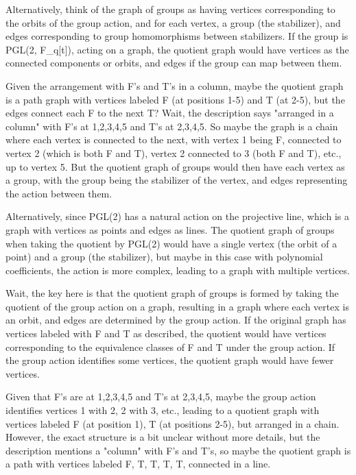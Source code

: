 Alternatively, think of the graph of groups as having vertices corresponding to the orbits of the group action, and for each vertex, a group (the stabilizer), and edges corresponding to group homomorphisms between stabilizers. If the group is PGL(2, F_q[t]), acting on a graph, the quotient graph would have vertices as the connected components or orbits, and edges if the group can map between them. 

Given the arrangement with F's and T's in a column, maybe the quotient graph is a path graph with vertices labeled F (at positions 1-5) and T (at 2-5), but the edges connect each F to the next T? Wait, the description says "arranged in a column" with F's at 1,2,3,4,5 and T's at 2,3,4,5. So maybe the graph is a chain where each vertex is connected to the next, with vertex 1 being F, connected to vertex 2 (which is both F and T), vertex 2 connected to 3 (both F and T), etc., up to vertex 5. But the quotient graph of groups would then have each vertex as a group, with the group being the stabilizer of the vertex, and edges representing the action between them. 

Alternatively, since PGL(2) has a natural action on the projective line, which is a graph with vertices as points and edges as lines. The quotient graph of groups when taking the quotient by PGL(2) would have a single vertex (the orbit of a point) and a group (the stabilizer), but maybe in this case with polynomial coefficients, the action is more complex, leading to a graph with multiple vertices. 

Wait, the key here is that the quotient graph of groups is formed by taking the quotient of the group action on a graph, resulting in a graph where each vertex is an orbit, and edges are determined by the group action. If the original graph has vertices labeled with F and T as described, the quotient would have vertices corresponding to the equivalence classes of F and T under the group action. If the group action identifies some vertices, the quotient graph would have fewer vertices. 

Given that F's are at 1,2,3,4,5 and T's at 2,3,4,5, maybe the group action identifies vertices 1 with 2, 2 with 3, etc., leading to a quotient graph with vertices labeled F (at position 1), T (at positions 2-5), but arranged in a chain. However, the exact structure is a bit unclear without more details, but the description mentions a "column" with F's and T's, so maybe the quotient graph is a path with vertices labeled F, T, T, T, T, connected in a line. 

